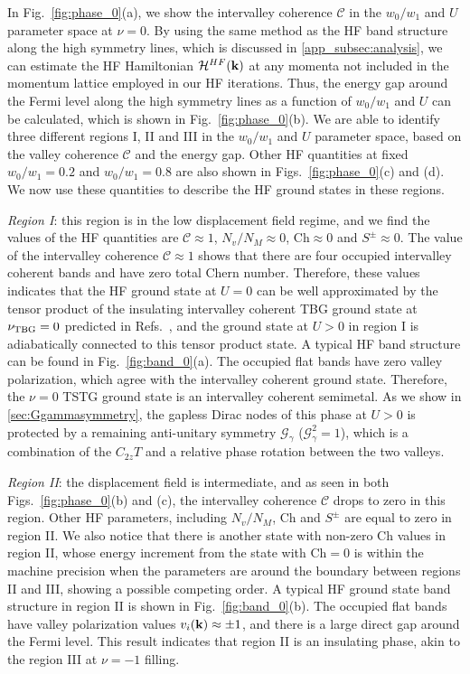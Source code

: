 \documentclass[prb,aps,nofootinbib,amssymb,twocolumn,superscriptaddress,10pt]{revtex4-2}
\begin{document}
In Fig.~\ref{fig:phase_0}(a), we show the intervalley coherence $\mathcal{C}$ in the $w_0/w_1$ and $U$ parameter space at $\nu=0$. By using the same method as the HF band structure along the high symmetry lines, which is discussed in \ref{app_subsec:analysis}, we can estimate the HF Hamiltonian $\mathcal{H}^{HF}(\mathbf{k})$ at any momenta not included in the momentum lattice employed in our HF iterations.
Thus, the energy gap around the Fermi level along the high symmetry lines as a function of $w_0/w_1$ and $U$ can be calculated, which is shown in Fig.~\ref{fig:phase_0}(b).
We are able to identify three different regions I, II and III in the $w_0/w_1$ and $U$ parameter space, based on the valley coherence $\mathcal{C}$ and the energy gap. Other HF quantities at fixed $w_0/w_1 = 0.2$ and $w_0/w_1 = 0.8$ are also shown in Figs.~\ref{fig:phase_0}(c) and (d). We now use these quantities to describe the HF ground states in these regions.



{\it Region I}: this region is in the low displacement field regime, and we find the values of the HF quantities are $\mathcal{C}\approx 1$, $N_v/N_M \approx 0$, $\mathrm{Ch} \approx 0$ and $S^\pm \approx 0$. The value of the intervalley coherence $\mathcal{C}\approx 1$ shows that there are four occupied intervalley coherent bands and have zero total Chern number. Therefore, these values indicates that the HF ground state at $U=0$ can be well approximated by the tensor product of the insulating intervalley coherent TBG ground state at $\nu_{\rm TBG} = 0$ predicted in Refs.~\cite{ZHA20,LIA20}, and the ground state at $U > 0$ in region I is adiabatically connected to this tensor product state.
A typical HF band structure can be found in Fig.~\ref{fig:band_0}(a). The occupied flat bands have zero valley polarization, which agree with the intervalley coherent ground state. Therefore, the $\nu=0$ TSTG ground state is an intervalley coherent semimetal. As we show in \ref{sec:Ggammasymmetry}, the gapless Dirac nodes of this phase at $U>0$ is protected by a remaining anti-unitary symmetry $\mathcal{G}_\gamma$ ($\mathcal{G}_\gamma^2=1$), which is a combination of the $C_{2z}T$ and a relative phase rotation between the two valleys.

{\it Region II}: the displacement field is intermediate, and as seen in both Figs.~\ref{fig:phase_0}(b) and (c), the intervalley coherence $\mathcal{C}$ drops to zero in this region. 
Other HF parameters, including $N_v/N_M$, $\mathrm{Ch}$ and $S^\pm$ are equal to zero in region II. We also notice that there is another state with non-zero $\mathrm{Ch}$ values in region II, whose energy increment from the state with $\mathrm{Ch} = 0$ is within the machine precision when the parameters are around the boundary between regions II and III, showing a possible competing order. 
A typical HF ground state band structure in region II is shown in Fig.~\ref{fig:band_0}(b). 
The occupied flat bands have valley polarization values $v_i(\mathbf{k}) \approx \pm1$, and there is a large direct gap around the Fermi level. This result indicates that region II is an insulating phase, akin to the region III at $\nu=-1$ filling.
\end{document}
